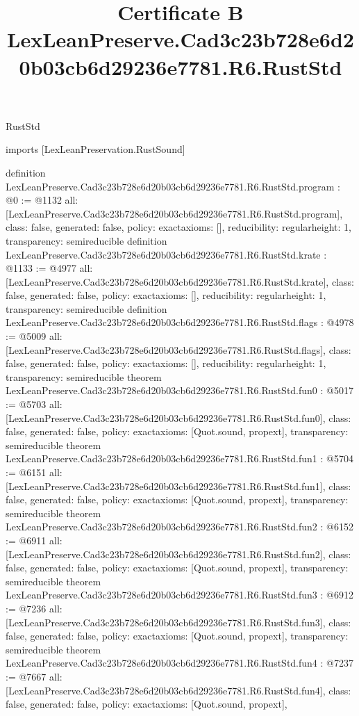 \begin{lexlean}{RustStd}
\title{Certificate B LexLeanPreserve.Cad3c23b728e6d20b03cb6d29236e7781.R6.RustStd}
\begin{coremodule}
imports [LexLeanPreservation.RustSound]

definition LexLeanPreserve.Cad3c23b728e6d20b03cb6d29236e7781.R6.RustStd.program : @0 := @1132 {
  all: [LexLeanPreserve.Cad3c23b728e6d20b03cb6d29236e7781.R6.RustStd.program],
  class: false,
  generated: false,
  policy: exact{axioms: []},
  reducibility: regular{height: 1},
  transparency: semireducible
}
definition LexLeanPreserve.Cad3c23b728e6d20b03cb6d29236e7781.R6.RustStd.krate : @1133 := @4977 {
  all: [LexLeanPreserve.Cad3c23b728e6d20b03cb6d29236e7781.R6.RustStd.krate],
  class: false,
  generated: false,
  policy: exact{axioms: []},
  reducibility: regular{height: 1},
  transparency: semireducible
}
definition LexLeanPreserve.Cad3c23b728e6d20b03cb6d29236e7781.R6.RustStd.flags : @4978 := @5009 {
  all: [LexLeanPreserve.Cad3c23b728e6d20b03cb6d29236e7781.R6.RustStd.flags],
  class: false,
  generated: false,
  policy: exact{axioms: []},
  reducibility: regular{height: 1},
  transparency: semireducible
}
theorem LexLeanPreserve.Cad3c23b728e6d20b03cb6d29236e7781.R6.RustStd.fun0 : @5017 := @5703 {
  all: [LexLeanPreserve.Cad3c23b728e6d20b03cb6d29236e7781.R6.RustStd.fun0],
  class: false,
  generated: false,
  policy: exact{axioms: [Quot.sound, propext]},
  transparency: semireducible
}
theorem LexLeanPreserve.Cad3c23b728e6d20b03cb6d29236e7781.R6.RustStd.fun1 : @5704 := @6151 {
  all: [LexLeanPreserve.Cad3c23b728e6d20b03cb6d29236e7781.R6.RustStd.fun1],
  class: false,
  generated: false,
  policy: exact{axioms: [Quot.sound, propext]},
  transparency: semireducible
}
theorem LexLeanPreserve.Cad3c23b728e6d20b03cb6d29236e7781.R6.RustStd.fun2 : @6152 := @6911 {
  all: [LexLeanPreserve.Cad3c23b728e6d20b03cb6d29236e7781.R6.RustStd.fun2],
  class: false,
  generated: false,
  policy: exact{axioms: [Quot.sound, propext]},
  transparency: semireducible
}
theorem LexLeanPreserve.Cad3c23b728e6d20b03cb6d29236e7781.R6.RustStd.fun3 : @6912 := @7236 {
  all: [LexLeanPreserve.Cad3c23b728e6d20b03cb6d29236e7781.R6.RustStd.fun3],
  class: false,
  generated: false,
  policy: exact{axioms: [Quot.sound, propext]},
  transparency: semireducible
}
theorem LexLeanPreserve.Cad3c23b728e6d20b03cb6d29236e7781.R6.RustStd.fun4 : @7237 := @7667 {
  all: [LexLeanPreserve.Cad3c23b728e6d20b03cb6d29236e7781.R6.RustStd.fun4],
  class: false,
  generated: false,
  policy: exact{axioms: [Quot.sound, propext]},
}
\end{coremodule}
\end{lexlean}
